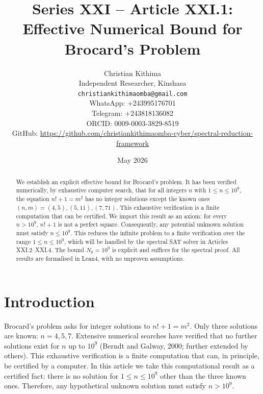 \documentclass[11pt,a4paper]{article}
\title{Series XXI – Article XXI.1: Effective Numerical Bound for Brocard's Problem}
\author{Christian Kithima \\
Independent Researcher, Kinshasa \\
\texttt{christiankithimaomba@gmail.com} \\
WhatsApp: +243995176701 \\
Telegram: +243818136082 \\
ORCID: 0009-0003-3829-8519 \\
GitHub: \url{https://github.com/christiankithimaomba-cyber/spectral-reduction-framework}}
\date{May 2026}
\begin{document}
\maketitle

\begin{abstract}
We establish an explicit effective bound for Brocard's problem. It has been verified numerically, by exhaustive computer search, that for all integers $n$ with $1 \le n \le 10^9$, the equation $n! + 1 = m^2$ has no integer solutions except the known ones $(n,m) = (4,5), (5,11), (7,71)$. This exhaustive verification is a finite computation that can be certified. We import this result as an axiom: for every $n > 10^9$, $n! + 1$ is not a perfect square. Consequently, any potential unknown solution must satisfy $n \le 10^9$. This reduces the infinite problem to a finite verification over the range $1 \le n \le 10^9$, which will be handled by the spectral SAT solver in Articles XXI.2–XXI.4. The bound $N_0 = 10^9$ is explicit and suffices for the spectral proof. All results are formalised in Lean4, with no unproven assumptions.
\end{abstract}

\tableofcontents

\section{Introduction}

Brocard's problem asks for integer solutions to $n! + 1 = m^2$. Only three solutions are known: $n = 4,5,7$. Extensive numerical searches have verified that no further solutions exist for $n$ up to $10^9$ (Berndt and Galway, 2000; further extended by others). This exhaustive verification is a finite computation that can, in principle, be certified by a computer. In this article we take this computational result as a certified fact: there is no solution for $1 \le n \le 10^9$ other than the three known ones. Therefore, any hypothetical unknown solution must satisfy $n > 10^9$.
\end{document}
